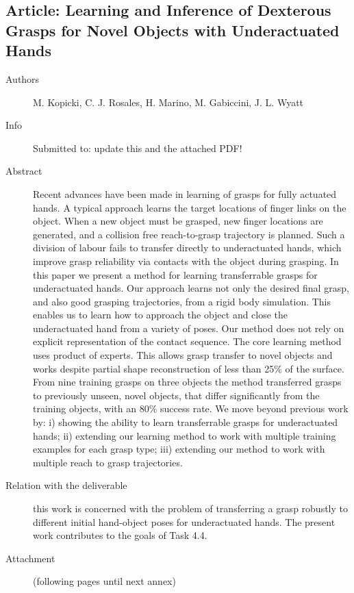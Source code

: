 \documentclass[a4paper,11pt,pdf]{pacmanreport}
\begin{document}

\subsection{Article: Learning and Inference of Dexterous Grasps for Novel Objects with Underactuated Hands}
\label{ann:LearningInferenceUnderactuatedHands}
\begin{description}
    \item[Authors] M. Kopicki, C. J. Rosales, H. Marino, M. Gabiccini, J. L. Wyatt
    \item[Info] Submitted to: {\color{red} update this and the attached PDF!}
    \item[Abstract] Recent advances have been made in learning of grasps for fully actuated hands. A typical approach learns the target locations of finger links on the object. When a new object must be grasped, new finger locations are generated, and a collision free reach-to-grasp trajectory is planned. Such a division of labour fails to transfer directly to underactuated hands, which improve grasp reliability via contacts with the object during grasping. In this paper we present a method for learning transferrable grasps for underactuated hands. Our approach learns not only the desired final grasp, and also good grasping trajectories, from a rigid body simulation. This enables us to learn how to approach the object and close the underactuated hand from a variety of poses. Our method does not rely on explicit representation of the contact sequence.
The core learning method uses product of experts. This allows grasp transfer to novel objects and works despite partial shape reconstruction of less than 25\% of the surface. From nine training grasps on three objects the method transferred grasps to previously unseen, novel objects, that differ significantly from the training objects, with an 80\% success rate. We move beyond previous work by: i) showing the ability to learn transferrable grasps for underactuated hands; ii) extending our learning
method to work with multiple training examples for each grasp
type; iii) extending our method to work with multiple reach to
grasp trajectories.
    \item[Relation with the deliverable] this work is concerned with the problem of transferring a grasp robustly to different initial hand-object poses for underactuated hands. The present work contributes to the goals of Task 4.4.
    \item[Attachment] (following pages until next annex)
\end{description}

\end{document}

